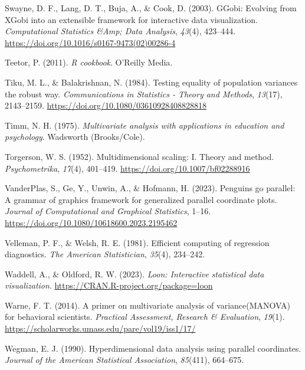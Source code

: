 \documentclass[
  letterpaper,
  10pt,
  krantz2]{krantz}
\newlength{\cslhangindent}
\newenvironment{CSLReferences}[2] %
 {\begin{list}{}{%
  \setlength{\itemindent}{0pt}
  \setlength{\leftmargin}{0pt}
  \setlength{\parsep}{0pt}
  \ifodd #1
   \setlength{\leftmargin}{\cslhangindent}
   \setlength{\itemindent}{-1\cslhangindent}
  \fi
  \setlength{\itemsep}{#2\baselineskip}}}
 {\end{list}}
\begin{document}
\begin{CSLReferences}{1}{0}
Swayne, D. F., Lang, D. T., Buja, A., \& Cook, D. (2003). {GGobi}:
Evolving from {XGobi} into an extensible framework for interactive data
visualization. \emph{Computational Statistics \&Amp; Data Analysis},
\emph{43}(4), 423--444.
\url{https://doi.org/10.1016/s0167-9473(02)00286-4}

Teetor, P. (2011). \emph{{R cookbook}}. {O'Reilly} Media.

Tiku, M. L., \& Balakrishnan, N. (1984). Testing equality of population
variances the robust way. \emph{Communications in Statistics - Theory
and Methods}, \emph{13}(17), 2143--2159.
\url{https://doi.org/10.1080/03610928408828818}

Timm, N. H. (1975). \emph{Multivariate analysis with applications in
education and psychology}. Wadsworth (Brooks/Cole).

Torgerson, W. S. (1952). Multidimensional scaling: I. Theory and method.
\emph{Psychometrika}, \emph{17}(4), 401--419.
\url{https://doi.org/10.1007/bf02288916}

VanderPlas, S., Ge, Y., Unwin, A., \& Hofmann, H. (2023). Penguins go
parallel: A grammar of graphics framework for generalized parallel
coordinate plots. \emph{Journal of Computational and Graphical
Statistics}, 1--16. \url{https://doi.org/10.1080/10618600.2023.2195462}

Velleman, P. F., \& Welsh, R. E. (1981). Efficient computing of
regression diagnostics. \emph{The American Statistician}, \emph{35}(4),
234--242.

Waddell, A., \& Oldford, R. W. (2023). \emph{Loon: Interactive
statistical data visualization}.
\url{https://CRAN.R-project.org/package=loon}

Warne, F. T. (2014). A primer on multivariate analysis of
variance(MANOVA) for behavioral scientists. \emph{Practical Assessment,
Research \& Evaluation}, \emph{19}(1).
\url{https://scholarworks.umass.edu/pare/vol19/iss1/17/}

Wegman, E. J. (1990). Hyperdimensional data analysis using parallel
coordinates. \emph{Journal of the American Statistical Association},
\emph{85}(411), 664--675.


\end{CSLReferences}
\end{document}
